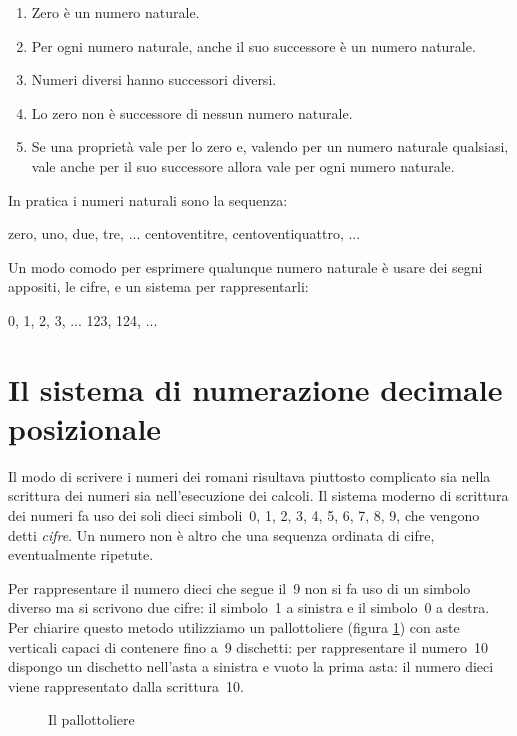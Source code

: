 \begin{enumerate}[noitemsep]
 \item Zero è un numero naturale.
 \item Per ogni numero naturale, anche il suo successore è un numero 
naturale.
 \item Numeri diversi hanno successori diversi.
 \item Lo zero non è successore di nessun numero naturale.
 \item Se una proprietà vale per lo zero e, 
   valendo per un numero naturale qualsiasi, 
   vale anche per il suo successore 
   allora vale per ogni numero naturale.
\end{enumerate}

In pratica i numeri naturali sono la sequenza:

 zero, uno, due, tre, ... centoventitre, centoventiquattro, ...

Un modo comodo per esprimere qualunque numero naturale è usare dei segni 
appositi, le cifre, e un sistema per rappresentarli:

 0, 1, 2, 3, ... 123, 124, ...

\section{Il sistema di numerazione decimale posizionale}
\label{sec:nat_sist10}

Il modo di scrivere i numeri dei romani risultava piuttosto complicato sia 
nella scrittura dei numeri sia nell'esecuzione dei calcoli. 
Il sistema moderno di scrittura dei numeri fa uso dei soli dieci 
simboli~0, 1, 2, 3, 4, 5, 6, 7, 8, 9, che vengono detti \emph{cifre}.
Un numero non è altro che una sequenza ordinata di cifre, eventualmente 
ripetute.

Per rappresentare il numero dieci che segue il~9 non si fa uso di un 
simbolo diverso ma si scrivono due cifre: il simbolo~1 a sinistra e il 
simbolo~0 a destra. 
Per chiarire questo metodo utilizziamo un pallottoliere 
(figura \ref{fig:pallottoliere}) con aste verticali capaci di contenere 
fino a~9 dischetti: per rappresentare il numero~10 dispongo un dischetto 
nell'asta a sinistra e vuoto la prima asta: 
il numero dieci viene rappresentato dalla scrittura~10.

\begin{inaccessibleblock}[Pallottoliere]
\begin{figure}[h]
\begin{center}

\caption{Il pallottoliere}
\label{fig:pallottoliere}
\end{center}
\end{figure}
\end{inaccessibleblock}

